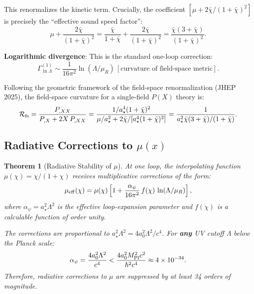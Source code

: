 \documentclass[11pt,a4paper]{article}
\newtheorem{theorem}{Theorem}
\begin{document}
This renormalizes the kinetic term. Crucially, the coefficient $[\mu + 2\bar\chi/(1+\bar\chi)^2]$ is precisely the ``effective sound speed factor'':
\begin{equation}
\mu + \frac{2\bar\chi}{(1+\bar\chi)^2} = \frac{\bar\chi}{1+\bar\chi} + \frac{2\bar\chi}{(1+\bar\chi)^2}
= \frac{\bar\chi(3+\bar\chi)}{(1+\bar\chi)^2}.
\end{equation}

\textbf{Logarithmic divergence}: This is the standard one-loop correction:
\begin{equation}
\Gamma^{(1)}_{\ln\Lambda} \sim \frac{1}{16\pi^2}\ln(\Lambda/\mu_R)\,\left[\text{curvature of field-space metric}\right].
\end{equation}

Following the geometric framework of the field-space renormalization (JHEP 2025), the field-space curvature for a single-field $P(X)$ theory is:
\begin{equation}
\mathcal{R}_{\rm fs} = \frac{P_{,XX}}{P_{,X} + 2X\,P_{,XX}} = \frac{1/a_\star^4(1+\bar\chi)^2}{\mu/a_\star^2 + 2\bar\chi/[a_\star^4(1+\bar\chi)^2]}
= \frac{1}{a_\star^2\bar\chi(3+\bar\chi)/(1+\bar\chi)}.
\end{equation}

\subsection{Radiative Corrections to $\mu(x)$}
\label{sec:mu-corrections}

\begin{theorem}[Radiative Stability of $\mu$]
\label{thm:mu-stability}
At one loop, the interpolating function $\mu(\chi) = \chi/(1+\chi)$ receives multiplicative corrections of the form:
\begin{equation}
\mu_{\rm eff}(\chi) = \mu(\chi)\left[1 + \frac{\alpha_\psi}{16\pi^2}\,f(\chi)\,\ln(\Lambda/\mu_R)\right],
\end{equation}
where $\alpha_\psi = a_\star^2\Lambda^2$ is the effective loop-expansion parameter and $f(\chi)$ is a calculable function of order unity.

The corrections are proportional to $a_\star^2\Lambda^2 = 4a_0^2\Lambda^2/c^4$. For \textbf{any} UV cutoff $\Lambda$ below the Planck scale:
\begin{equation}
\alpha_\psi = \frac{4a_0^2\Lambda^2}{c^4} < \frac{4a_0^2 M_{\rm Pl}^2 c^2}{\hbar^2 c^4}
\approx 4\times 10^{-34}.
\end{equation}
Therefore, radiative corrections to $\mu$ are suppressed by at least 34 orders of magnitude.
\end{theorem}
\end{document}
